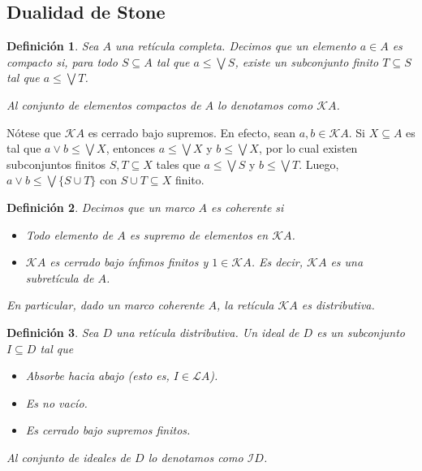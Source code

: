 \documentclass[12pt,letterpaper,titlepage]{article}
\newtheorem*{defn}{Definición}
\theoremstyle{definition}
\renewcommand\sup{\vee}
\newcommand\Sup{\bigvee}
\renewcommand\cal[1]{\mathcal{#1}}
\newcommand\<{\langle}
\renewcommand\>{\rangle}
\begin{document}
\subsection{Dualidad de Stone}

\begin{defn}
    Sea $A$ una retícula completa.
    Decimos que un elemento $a\in A$ es compacto si,
    para todo $S\subseteq A$ tal que $a\leq\Sup S$,
    existe un subconjunto finito $T\subseteq S$ tal que
    $a\leq\Sup T$.
    
    Al conjunto de elementos compactos
    de $A$ lo denotamos como $\cal KA$.
\end{defn}

Nótese que $\cal KA$ es cerrado bajo supremos.
En efecto, sean $a,b\in\cal KA$.
Si $X\subseteq A$ es tal que $a\sup b\leq\Sup X$,
entonces $a\leq\Sup X$ y $b\leq\Sup X$, por lo cual
existen subconjuntos finitos $S,T\subseteq X$
tales que $a\leq\Sup S$ y $b\leq\Sup T$.
Luego, $a\sup b\leq\Sup\{S\cup T\}$ con $S\cup T\subseteq X$ finito.

\begin{defn}
    Decimos que un marco $A$ es coherente si
    \begin{itemize}
        \item Todo elemento de $A$ es supremo de elementos
        en $\cal KA$.
        \item $\cal KA$ es cerrado bajo ínfimos finitos
        y $1\in\cal KA$.
        Es decir, $\cal KA$ es una subretícula de $A$.
    \end{itemize}
    En particular, dado un marco coherente $A$, la retícula
    $\cal KA$ es distributiva.
\end{defn}

\begin{defn}
    Sea $D$ una retícula distributiva.
    Un ideal de $D$ es un subconjunto $I\subseteq D$ tal que
    \begin{itemize}
        \item Absorbe hacia abajo (esto es, $I\in\cal LA$).
        \item Es no vacío.
        \item Es cerrado bajo supremos finitos.
    \end{itemize}
    Al conjunto de ideales de $D$ lo denotamos como $\cal ID$.
\end{defn}
\end{document}
